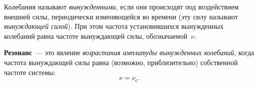 \documentclass[main.tex]{subfiles}
\begin{document}


Колебания называют \emph{вынужденными}, если они происходят под воздействием внешней силы, периодически изменяющейся во времени (эту силу называют \emph{вынуждающей силой}). При этом частота установившихся вынужденных колебаний равна частоте вынуждающей силы, обозначаемой~$\nu$.

\textbf{Резонанс}~--- это явление \emph{возрастания амплитуды вынужденных колебаний}, когда частота вынуждающей силы равна (возможно, приблизительно) собственной частоте системы: 
\begin{equation}
\nu=\nu_\text{с}.
\end{equation}


















 
\end{document}
